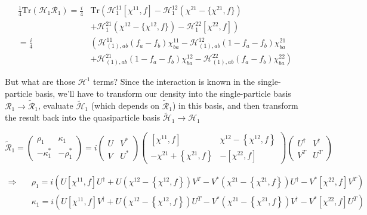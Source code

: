 \begin{align}\label{eqn:H1R1}
\frac{1}{4}\mathrm{Tr}\left(\mathcal{H}_{1}\mathcal{R}_{1}\right) = \frac{i}{4}
&\mathrm{Tr} \left(\mathcal{H}_{1}^{11}[\chi^{11},f] - \mathcal{H}_{1}^{12}(\chi^{21}-\{\chi^{21},f\}) \right. \nonumber\\
&\left.+ \mathcal{H}_{1}^{21}(\chi^{12}-\{\chi^{12},f\}) - \mathcal{H}_{1}^{22}[\chi^{22},f]\right) \nonumber\\
= \frac{i}{4}
& \left(\mathcal{H}_{(1),ab}^{11}(f_a-f_b)\chi^{11}_{ba} - \mathcal{H}_{(1),ab}^{12}(1-f_a-f_b)\chi^{21}_{ba} \right. \nonumber\\
&\left.+ \mathcal{H}_{(1),ab}^{21}(1-f_a-f_b)\chi^{12}_{ba} - \mathcal{H}_{(1),ab}^{22}(f_a-f_b)\chi^{22}_{ba}\right)
\end{align}

\noindent But what are those $\mathcal{H}^{1}$ terms? Since the interaction is known in the single-particle basis, we'll have to transform our density into the single-particle basis $\mathcal{R}_1\rightarrow\mathcal{\tilde{R}}_1$, evaluate $\mathcal{\tilde{H}}_1$ (which depends on $\mathcal{\tilde{R}}_1$) in this basis, and then transform the result back into the quasiparticle basis $\mathcal{\tilde{H}}_1\rightarrow\mathcal{H}_1$

\begin{equation}
\mathcal{\tilde{R}}_1 = \left(\begin{array}{cc}
\rho_1 & \kappa_1 \\
-\kappa_1^* & -\rho_1^*
\end{array}\right) = 
i\left(\begin{array}{cc}
U & V^* \\
V & U^*
\end{array}\right)
\left(\begin{array}{cc}
[\chi^{11},f] & \chi^{12}-\left\{\chi^{12},f\right\} \\
-\chi^{21}+\left\{\chi^{21},f\right\} & -[\chi^{22},f]
\end{array}\right)
\left(\begin{array}{cc}
U^\dagger & V^\dagger \\
V^T & U^T
\end{array}\right)
\end{equation}

\begin{align}
\Rightarrow \quad
& \rho_1 = i\left(U[\chi^{11},f]U^\dagger + U\left(\chi^{12}-\left\{\chi^{12},f\right\}\right)V^T - V^*\left(\chi^{21}-\left\{\chi^{21},f\right\}\right)U^\dagger - V^*[\chi^{22},f]V^T \right) \\
& \kappa_1 = i\left(U[\chi^{11},f]V^\dagger + U\left(\chi^{12}-\left\{\chi^{12},f\right\}\right)U^T - V^*\left(\chi^{21}-\left\{\chi^{21},f\right\}\right)V^\dagger - V^*[\chi^{22},f]U^T \right)
\end{align}

